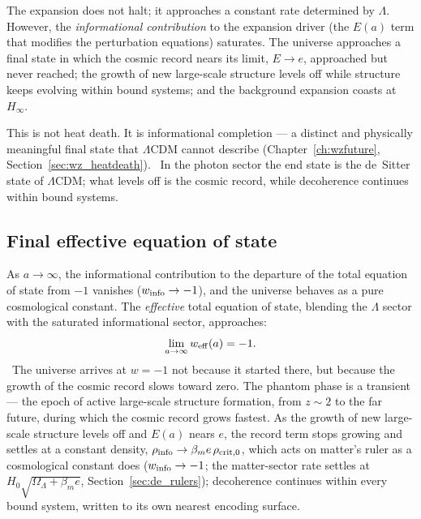 The expansion does not halt; it approaches a constant rate determined by $\Lambda$. However, the \emph{informational contribution} to the
expansion driver (the $E(a)$ term that modifies the perturbation equations) saturates. The universe approaches a final state in which the
cosmic record nears its limit, $E\to e$, approached but never reached; the growth of new large-scale structure levels off while structure
keeps evolving within bound systems; and the background expansion coasts at $H_\infty$. \calc

This is not heat death. It is informational completion --- a distinct and physically meaningful final state that $\Lambda$CDM cannot describe
(Chapter~\ref{ch:wzfuture}, Section~\ref{sec:wz_heatdeath}). \interp\ In the photon sector the end state is the de~Sitter state of $\Lambda$CDM;
what levels off is the cosmic record, while decoherence continues within bound systems.

\subsection{Final effective equation of state}\label{sec:de_weff}
As $a\to\infty$, the informational contribution to the departure of the total equation of state from $-1$ vanishes ($w_{\rm info}\to-1$), and the
universe behaves as a pure cosmological constant. The \emph{effective} total equation of state, blending the $\Lambda$ sector with the saturated
informational sector, approaches:
\begin{equation}\lim_{a\to\infty}w_{\rm eff}(a)=-1 .\label{eq:de_weff}\end{equation}
\derived\ The universe arrives at $w=-1$ not because it started there, but because the growth of the cosmic record slows toward zero. The phantom
phase is a transient --- the epoch of active large-scale structure formation, from $z\sim2$ to the far future, during which the cosmic record grows
fastest. As the growth of new large-scale structure levels off and $E(a)$ nears $e$, the record term stops growing and settles at a constant
density, $\rho_{\rm info}\to\beta_m e\,\rho_{\rm crit,0}$, which acts on matter's ruler as a cosmological constant does ($w_{\rm info}\to-1$; the
matter-sector rate settles at $H_0\sqrt{\Omega_\Lambda+\beta_me}$, Section~\ref{sec:de_rulers}); decoherence continues within every bound system,
written to its own nearest encoding surface. \interp

